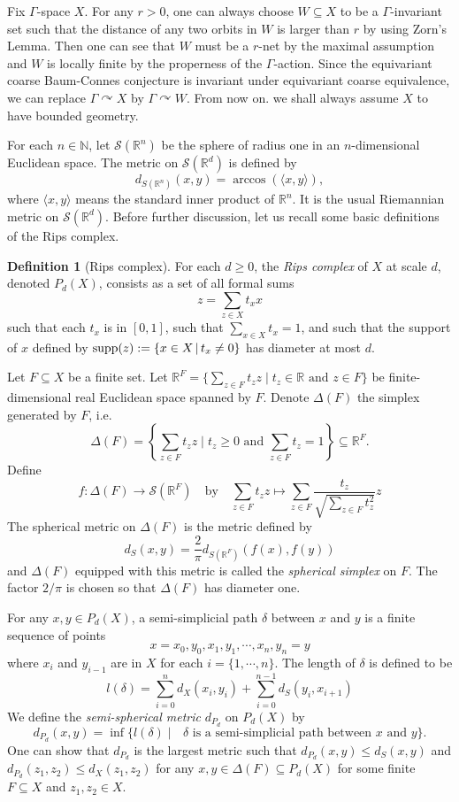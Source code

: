\documentclass[11pt]{article}
\theoremstyle{definition}
\newtheorem{Def}{Definition}[section]
\theoremstyle{plain}
\def\IN{\mathbb N}\def\IR{\mathbb R}\def\IE{\mathbb E}\def\IC{\mathbb C}\def\IL{\mathbb L}\def\IQ{\mathbb Q}\def\IA{\mathbb A}\def\IZ{\mathbb Z}
\def\supp{\textup{supp}}
\def\Ga{\Gamma}
\def\car{\curvearrowright}
\begin{document}
Fix $\Ga$-space $X$. For any $r>0$, one can always choose $W\subseteq X$ to be a $\Ga$-invariant set such that the distance of any two orbits in $W$ is larger than $r$ by using Zorn's Lemma. Then one can see that $W$ must be a $r$-net by the maximal assumption and $W$ is locally finite by the properness of the $\Ga$-action. Since the equivariant coarse Baum-Connes conjecture is invariant under equivariant coarse equivalence, we can replace $\Ga\car X$ by $\Ga\car W$. From now on. we shall always assume $X$ to have bounded geometry.

For each $n\in\IN$, let $\mathcal{S}(\mathbb{R}^n)$ be the sphere of radius one in an $n$-dimensional Euclidean space. The metric on $\mathcal{S}(\mathbb{R}^d)$ is defined by
$$d_{S(\IR^n)}(x,y)=\arccos(\langle x,y\rangle),$$
where $\langle x,y\rangle$ means the standard inner product of $\IR^n$. It is the usual Riemannian metric on $\mathcal{S}(\mathbb{R}^d)$. Before further discussion, let us recall some basic definitions of the Rips complex.

\begin{Def}[Rips complex]
For each $d\geq 0$, the \emph{Rips complex} of $X$ at scale $d$, denoted $P_d(X)$, consists as a set of all formal sums
$$z=\sum_{z\in X}t_xx$$
such that each $t_x$ is in $[0,1]$, such that $\sum_{x\in X}t_x=1$, and such that the support of $x$ defined by $\supp(z):=\{x\in X\,|\,t_x\ne0\}$ has diameter at most $d$.
\end{Def}

Let $F\subseteq X$ be a finite set. Let $\mathbb{R}^F=\{\sum_{z\in F}t_zz\mid t_z\in\IR\text{ and }z\in F\}$ be finite-dimensional real Euclidean space spanned by $F$. Denote $\Delta(F)$ the simplex generated by $F$, i.e.
$$\Delta(F)=\left\{\sum_{z\in F}t_zz\;\Big|\;t_z\geq 0\text{ and }\sum_{z\in F}t_z=1\right\}\subseteq \IR^F.$$
Define 
$$f:\Delta(F)\to\mathcal{S}(\mathbb{R}^F)\quad\text{by}\quad \sum_{z\in F}t_zz\mapsto\sum_{z\in F}\frac{t_z}{\sqrt{\sum_{z\in F}t^2_z}} z$$
The spherical metric on $\Delta(F)$ is the metric defined by
$$d_S(x,y)=\frac{2}{\pi}d_{S(\IR^F)}(f(x),f(y))$$
and $\Delta(F)$ equipped with this metric is called the \emph{spherical simplex} on $F$. The factor $2/\pi$ is chosen so that $\Delta(F)$ has diameter one.

For any $x,y\in P_d(X)$, a semi-simplicial path $\delta$ between $x$ and $y$ is a finite sequence of points
$$x=x_0,y_0,x_1,y_1,\cdots,x_n,y_n=y$$
where $x_i$ and $y_{i-1}$ are in $X$ for each $i=\{1,\cdots,n\}$. The length of $\delta$ is defined to be
$$l(\delta)=\sum_{i=0}^{n}d_X(x_i,y_i)+\sum_{i=0}^{n-1}d_S(y_i,x_{i+1})$$
We define the \emph{semi-spherical metric} $d_{P_d}$ on $P_d(X)$ by
$$d_{P_d}(x,y)=\inf\{l(\delta)\mid\text{ $\delta$ is a semi-simplicial path between $x$ and $y$}\}.$$
One can show that $d_{P_d}$ is the largest metric such that $d_{P_d}(x,y)\leq d_S(x,y)$ and $d_{P_d}(z_1,z_2)\leq d_X(z_1,z_2)$ for any $x,y\in \Delta(F)\subseteq P_d(X)$ for some finite $F\subseteq X$ and $z_1,z_2\in X$.
\end{document}
